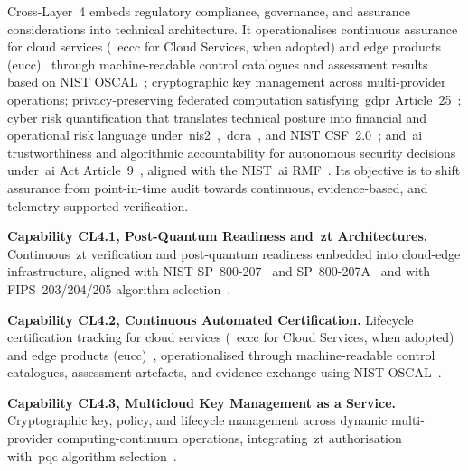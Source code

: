 \documentclass{ieeeaccess}
\begin{document}
Cross-Layer~4 embeds regulatory compliance, governance, and assurance considerations into technical architecture. It operationalises continuous assurance for cloud services (~\gls{eccc} for Cloud Services, when adopted) and edge products (\gls{eucc})~\cite{commreg2024eucc,eucsa} through machine-readable control catalogues and assessment results based on NIST OSCAL~\cite{oscal2024,iorga2024oscal}; cryptographic key management across multi-provider operations; privacy-preserving federated computation satisfying~\gls{gdpr} Article~25~\cite{eugdpr}; cyber risk quantification that translates technical posture into financial and operational risk language under~\gls{nis2}~\cite{eunis2},~\gls{dora}~\cite{eudora}, and NIST CSF~2.0~\cite{nistcsf2}; and~\gls{ai} trustworthiness and algorithmic accountability for autonomous security decisions under~\gls{ai} Act Article~9~\cite{euaiact}, aligned with the NIST~\gls{ai} RMF~\cite{nistairmf}. Its objective is to shift assurance from point-in-time audit towards continuous, evidence-based, and telemetry-supported verification.

\textbf{Capability CL4.1, Post-Quantum Readiness and~\gls{zt} Architectures.} Continuous~\gls{zt} verification and post-quantum readiness embedded into cloud-edge infrastructure, aligned with NIST SP~800-207~\cite{rose2020zta} and SP~800-207A~\cite{chandramouli2023zta} and with FIPS~203/204/205 algorithm selection~\cite{nistfips203,nistfips204,nistfips205}.

\textbf{Capability CL4.2, Continuous Automated Certification.} Lifecycle certification tracking for cloud services (~\gls{eccc} for Cloud Services, when adopted) and edge products (\gls{eucc})~\cite{commreg2024eucc,eucsa}, operationalised through machine-readable control catalogues, assessment artefacts, and evidence exchange using NIST OSCAL~\cite{oscal2024,iorga2024oscal}.

\textbf{Capability CL4.3, Multicloud Key Management as a Service.} Cryptographic key, policy, and lifecycle management across dynamic multi-provider computing-continuum operations, integrating~\gls{zt} authorisation~\cite{rose2020zta,chandramouli2023zta} with~\gls{pqc} algorithm selection~\cite{nistfips203,nistfips204,nistfips205}.
\end{document}
